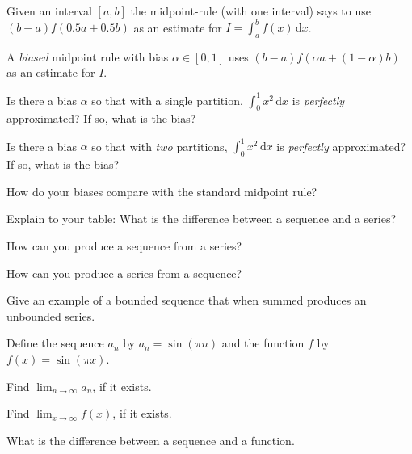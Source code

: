 \documentclass{workbook}
\begin{document}
\begin{slide}
	\question
	Given an interval $[a,b]$ the midpoint-rule (with one interval) says to use $(b-a)f(0.5a+0.5b)$ as an estimate
	for $I=\displaystyle \int_a^b f(x)\,\mathrm d x$.

	A \emph{biased} midpoint rule with bias $\alpha\in[0,1]$ uses $(b-a)f(\alpha a+(1-\alpha)b)$
	as an estimate for $I$.

	\begin{parts}
		\item Is there a bias $\alpha$ so that with a single partition, $\displaystyle\int_0^1 x^2\,\mathrm d x$ is \emph{perfectly} approximated? If so, what is the bias?

		\item Is there a bias $\alpha$ so that with \emph{two} partitions, $\displaystyle \int_0^1 x^2\,\mathrm d x$ is \emph{perfectly} approximated? If so, what is the bias?

		\item How do your biases compare with the standard midpoint rule?
	\end{parts}
\end{slide}

\begin{slide}
	\question

	\begin{parts}
		\item Explain to your table: What is the difference between a sequence and a series?
		\item How can you produce a sequence from a series?
		\item How can you produce a series from a sequence?
		\item Give an example of a bounded sequence that when summed produces an unbounded series.
	\end{parts}
\end{slide}

\begin{slide}
	\question
	Define the sequence $a_n$ by $
		a_n = \sin(\pi n)$
	and the function $f$ by $f(x) = \sin(\pi x)$.

	\begin{parts}
		\item Find $\displaystyle \lim_{n\to\infty} a_n$, if it exists.
		\item Find $\displaystyle \lim_{x\to\infty} f(x)$, if it exists.

		\item What is the difference between a sequence and a function.
	\end{parts}
\end{slide}
\end{document}
